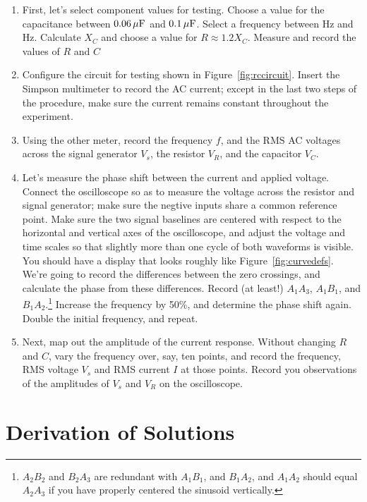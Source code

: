 \documentclass[12pt]{article}
\begin{document}
\begin{enumerate}
\item First, let's select component values for testing.  Choose a
  value for the capacitance between $\unit[0.06]{\mu F}$ and
  $\unit[0.1]{\mu F}$.  Select a frequency between \unit[300]{Hz} and
  \unit[600]{Hz}.  Calculate $X_C$ and choose a value for $R \approx
  1.2 X_C$.  Measure and record the values of $R$ and $C$
\item Configure the circuit for testing shown in
  Figure~\ref{fig:rccircuit}.  Insert the Simpson multimeter to record
  the AC current; except in the last two steps of the procedure, make
  sure the current remains constant throughout the experiment.
\item Using the other meter, record the frequency $f$, and the RMS AC
  voltages across the signal generator $V_s$, the resistor $V_R$, and
  the capacitor $V_C$.
\item \label{item:phase} Let's measure the phase shift between the
  current and applied voltage.  Connect the oscilloscope so as to
  measure the voltage across the resistor and signal generator; make
  sure the negtive inputs share a common reference point.  Make sure
  the two signal baselines are centered with respect to the horizontal
  and vertical axes of the oscilloscope, and adjust the voltage and
  time scales so that slightly more than one cycle of both waveforms
  is visible.  You should have a display that looks roughly like
  Figure~\ref{fig:curvedefs}.  We're going to record the differences
  between the zero crossings, and calculate the phase from these
  differences.  Record (at least!) $A_1A_3$, $A_1B_1$, and
  $B_1A_2$.\footnote{$A_2B_2$ and $B_2A_3$ are redundant with
    $A_1B_1$, and $B_1A_2$, and $A_1A_2$ should equal $A_2A_3$ if you
    have properly centered the sinusoid vertically.}  Increase the
  frequency by 50\%, and determine the phase shift again.  Double the
  initial frequency, and repeat.
\item \label{item:current}
  Next, map out the amplitude of the current response.  Without
  changing $R$ and $C$, vary the frequency over, say, ten points, and
  record the frequency, RMS voltage $V_s$ and RMS current $I$ at those
  points.  Record you observations of the amplitudes of $V_s$ and
  $V_R$ on the oscilloscope.
\end{enumerate}

\appendix

\section{Derivation of Solutions}
\label{sec:solutions}
\end{document}
